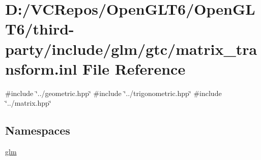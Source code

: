 \hypertarget{matrix__transform_8inl}{}\section{D\+:/\+V\+C\+Repos/\+Open\+G\+L\+T6/\+Open\+G\+L\+T6/third-\/party/include/glm/gtc/matrix\+\_\+transform.inl File Reference}
\label{matrix__transform_8inl}
{\ttfamily \#include \char`\"{}../geometric.\+hpp\char`\"{}}\newline
{\ttfamily \#include \char`\"{}../trigonometric.\+hpp\char`\"{}}\newline
{\ttfamily \#include \char`\"{}../matrix.\+hpp\char`\"{}}\newline
\subsection*{Namespaces}
\begin{DoxyCompactItemize}
\item 
 \mbox{\hyperlink{namespaceglm}{glm}}
\end{DoxyCompactItemize}
